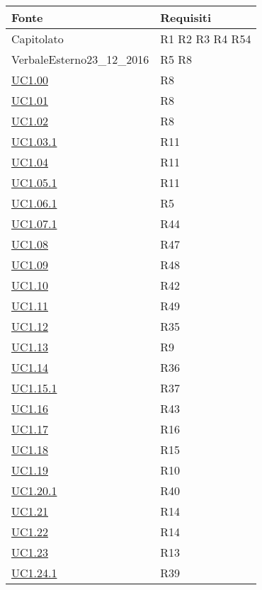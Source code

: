 \begin{longtable}{|P{6cm}|P{6cm}|}
	\hline \textbf{Fonte} & \textbf{Requisiti}\\
	\hline Capitolato & R1 \linebreak R2 \linebreak R3 \linebreak R4 \linebreak R54 \\
	\hline VerbaleEsterno23\_12\_2016 & R5 \linebreak R8 \\
	\hline \hyperref[UC1.00]{UC1.00} & R8 \\
	\hline \hyperref[UC1.01]{UC1.01} & R8 \\
	\hline \hyperref[UC1.02]{UC1.02} & R8 \\
	\hline \hyperref[UC1.03.1]{UC1.03.1} & R11 \\
	\hline \hyperref[UC1.04]{UC1.04} & R11 \\
	\hline \hyperref[UC1.05.1]{UC1.05.1} & R11 \\
	\hline \hyperref[UC1.06.1]{UC1.06.1} & R5 \\
	\hline \hyperref[UC1.07.1]{UC1.07.1} & R44 \\
	\hline \hyperref[UC1.08]{UC1.08} & R47 \\
	\hline \hyperref[UC1.09]{UC1.09} & R48 \\
	\hline \hyperref[UC1.10]{UC1.10} & R42 \\
	\hline \hyperref[UC1.11]{UC1.11} & R49 \\	
	\hline \hyperref[UC1.12]{UC1.12} & R35 \\
	\hline \hyperref[UC1.13]{UC1.13} & R9 \\	
	\hline \hyperref[UC1.14]{UC1.14} & R36 \\
	\hline \hyperref[UC1.15.1]{UC1.15.1} & R37 \\
	\hline \hyperref[UC1.16]{UC1.16} & R43 \\
	\hline \hyperref[UC1.17]{UC1.17} & R16 \\
	\hline \hyperref[UC1.18]{UC1.18} & R15 \\
	\hline \hyperref[UC1.19]{UC1.19} & R10 \\
	\hline \hyperref[UC1.20.1]{UC1.20.1} & R40 \\
	\hline \hyperref[UC1.21]{UC1.21} & R14 \\
	\hline \hyperref[UC1.22]{UC1.22} & R14 \\
	\hline \hyperref[UC1.23]{UC1.23} & R13 \\
	\hline \hyperref[UC1.24.1]{UC1.24.1} & R39 \\

\end{longtable}
